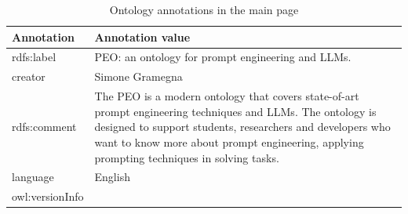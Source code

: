 \begin{table}[H]
    \centering
    \begin{tabular}{|>{\raggedright\arraybackslash}p{6cm}|>{\raggedright\arraybackslash}p{6cm}|}
        \hline
        \textbf{Annotation} & \textbf{Annotation value} \\ \hline
         rdfs:label & PEO: an ontology for prompt 
         engineering and LLMs. \\ \hline
         
         creator & Simone Gramegna\\ \hline
         
         rdfs:comment & The PEO is a modern ontology that covers state-of-art prompt engineering techniques and LLMs. The ontology is designed to support students, researchers and developers who want to know more about prompt engineering, applying prompting techniques in solving tasks. \\ \hline
         
         language & English \\ \hline
         
         owl:versionInfo & 1.0 \\ \hline
    \end{tabular}
    \caption{Ontology annotations in the main page}
    \label{table:t_4_1}
\end{table}


